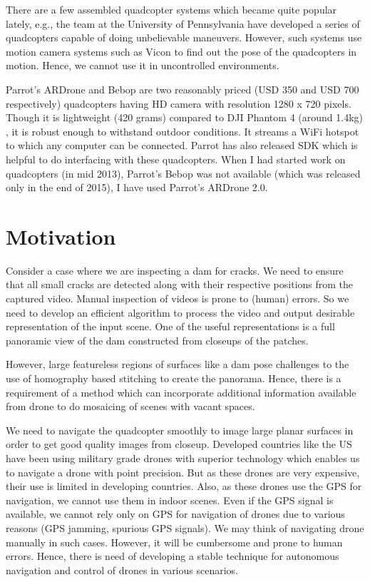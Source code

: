 There are a few assembled quadcopter systems which became quite popular lately,
e.g., the team at the University of Pennsylvania have developed a series of
quadcopters capable of doing unbelievable maneuvers. However, such systems use motion camera
systems such as Vicon to find out the pose of the quadcopters in motion.
Hence, we cannot use it in uncontrolled environments.

Parrot's ARDrone and Bebop are two reasonably priced (USD 350 and USD
700 respectively) quadcopters having HD camera with resolution 1280 x 720
pixels. Though it is lightweight (420 grams) compared to DJI Phantom 4
(around 1.4kg) , it is robust enough to withstand outdoor conditions. It streams
a WiFi hotspot to which any computer can be connected. Parrot has also released SDK which is helpful to
do interfacing with these quadcopters. When I had started work on
quadcopters (in mid 2013), Parrot's Bebop was not available (which was released
only in the end of 2015), I have used Parrot's ARDrone 2.0.

\section{Motivation}

Consider a case where  we are inspecting a dam for cracks. We need to ensure
that all small cracks are detected along with their respective positions from
the captured video. Manual inspection of videos is prone to (human) errors. 
So we need to develop an efficient algorithm to process the video and output
desirable representation of the input scene. One of the useful representations
is a full panoramic view of the dam constructed from closeups of the patches. 

However, large featureless regions of surfaces like a dam pose challenges to
the use of homography based stitching to create the panorama. Hence, there is a
requirement of a method which can incorporate additional information available from drone to do
mosaicing of scenes with vacant spaces. 

We need to navigate the quadcopter smoothly to image large planar surfaces in
order to get good quality images from closeup. Developed countries like the US
have been using military grade drones with superior technology which enables us to
navigate a drone with point precision. But as these drones are very expensive,
their use is limited in developing countries. Also, as these drones use the GPS
for navigation, we cannot use them in indoor scenes. Even if the GPS signal is
available, we cannot rely only on GPS for navigation of drones due to various
reasons (GPS jamming, spurious GPS signals). We may think of navigating drone
manually in such cases. However, it will be cumbersome and prone to human errors.
Hence, there is need of developing a stable technique for autonomous navigation
and control of drones in various scenarios.

